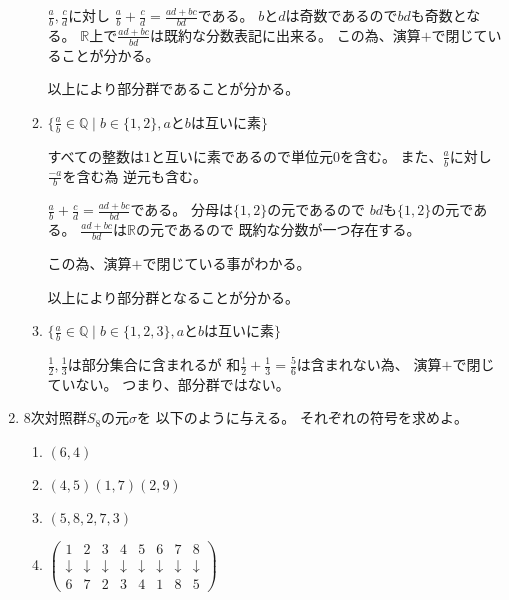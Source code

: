\documentclass[12pt,b5paper]{ltjsarticle}
\begin{document}
\begin{enumerate}
\begin{enumerate}
            $\frac{a}{b},\frac{c}{d}$に対し
            $\frac{a}{b}+\frac{c}{d} = \frac{ad+bc}{bd}$である。
            $b$と$d$は奇数であるので$bd$も奇数となる。
            $\mathbb{R}$上で$\frac{ad+bc}{bd}$は既約な分数表記に出来る。
            この為、演算$+$で閉じていることが分かる。

            以上により部分群であることが分かる。


       \item
            $\{ \frac{a}{b} \in \mathbb{Q} \mid b\in\{1,2\}, aとbは互いに素\}$

            すべての整数は$1$と互いに素であるので単位元$0$を含む。
            また、$\frac{a}{b}$に対し$\frac{-a}{b}$を含む為
            逆元も含む。

            $\frac{a}{b}+\frac{c}{d}=\frac{ad+bc}{bd}$である。
            分母は$\{1,2\}$の元であるので
            $bd$も$\{1,2\}$の元である。
            $\frac{ad+bc}{bd}$は$\mathbb{R}$の元であるので
            既約な分数が一つ存在する。

            この為、演算$+$で閉じている事がわかる。

            以上により部分群となることが分かる。


       \item
            $\{ \frac{a}{b} \in \mathbb{Q} \mid b\in\{1,2,3\}, aとbは互いに素\}$

            $\frac{1}{2},\frac{1}{3}$は部分集合に含まれるが
            和$\frac{1}{2}+\frac{1}{3}=\frac{5}{6}$は含まれない為、
            演算$+$で閉じていない。
            つまり、部分群ではない。
      \end{enumerate}

\hrulefill

 \item
      $8$次対照群$S_{8}$の元$\sigma$を
      以下のように与える。
      それぞれの符号を求めよ。
      \begin{enumerate}
       \item
            $(6,4)$

       \item
            $(4,5)(1,7)(2,9)$

       \item
            $(5,8,2,7,3)$

       \item
            $
            \begin{pmatrix}
             1 & 2 & 3 & 4 & 5 & 6 & 7 & 8\\
             \downarrow & \downarrow & \downarrow & \downarrow & \downarrow & \downarrow & \downarrow & \downarrow \\
             6 & 7 & 2 & 3 & 4 & 1 & 8 & 5
            \end{pmatrix}
            $
      \end{enumerate}


\end{enumerate}
\end{document}
